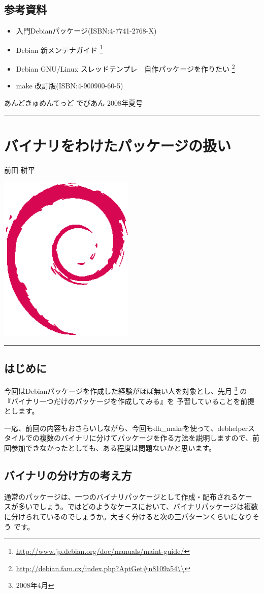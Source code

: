 \documentclass[mingoth,a4paper]{jsarticle}
\renewcommand{\dancersection}[2]{%
\newpage
あんどきゅめんてっど でびあん 2008年夏号
%
\vspace{0.1mm}\\
{\color{dancerlightblue}\rule{\hsize}{2mm}}

%
%
\begin{minipage}[t]{0.6\hsize}
\color{dancerdarkblue}
\vspace{1cm}
\section{#1}
\hfill{}#2\\
\end{minipage}
\begin{minipage}[t]{0.4\hsize}
\vspace{-2cm}
\hfill{}\includegraphics[height=8cm]{image200502/openlogo-nd.eps}\\
\vspace{-5cm}
\end{minipage}
%
%
{\color{dancerdarkblue}\rule{0.74\hsize}{2mm}}
%
\vspace{2cm}
}
\begin{document}
\subsection{参考資料}
\begin{itemize}
 
 \item  入門Debianパッケージ(ISBN:4-7741-2768-X)
 \item  Debian 新メンテナガイド
	\footnote{\url{http://www.jp.debian.org/doc/manuals/maint-guide/}}
 \item Debian GNU/Linux スレッドテンプレ　自作パッケージを作りたい
       \footnote{\url{http://debian.fam.cx/index.php?AptGet\#n8109a54\\}}
 \item make 改訂版(ISBN:4-900900-60-5)
\end{itemize}


\dancersection{バイナリをわけたパッケージの扱い}{前田 耕平}
\label{sec:multibinpkg}

\subsection{はじめに}

今回はDebianパッケージを作成した経験がほぼ無い人を対象とし、先月
\footnote{2008年4月} の『バイナリ一つだけのパッケージを作成してみる』を
予習していることを前提とします。

一応、前回の内容もおさらいしながら、今回もdh\_makeを使って、debhelperス
タイルでの複数のバイナリに分けてパッケージを作る方法を説明しますので、前
回参加できなかったとしても、ある程度は問題ないかと思います。

\subsection{バイナリの分け方の考え方}
通常のパッケージは、一つのバイナリパッケージとして作成・配布されるケー
スが多いでしょう。ではどのようなケースにおいて、バイナリパッケージは複数
に分けられているのでしょうか。大きく分けると次の三パターンくらいになりそう
です。
\end{document}
